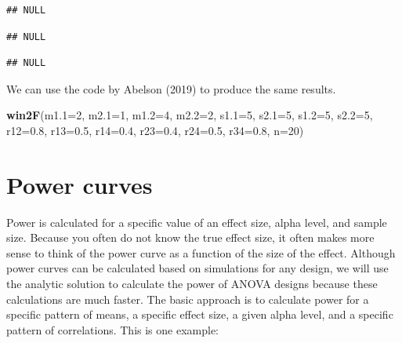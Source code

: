 \documentclass[]{book}
\newenvironment{Shaded}{\begin{snugshade}}{\end{snugshade}}
\newcommand{\DataTypeTok}[1]{\textcolor[rgb]{0.13,0.29,0.53}{#1}}
\newcommand{\DecValTok}[1]{\textcolor[rgb]{0.00,0.00,0.81}{#1}}
\newcommand{\FloatTok}[1]{\textcolor[rgb]{0.00,0.00,0.81}{#1}}
\newcommand{\KeywordTok}[1]{\textcolor[rgb]{0.13,0.29,0.53}{\textbf{#1}}}
\newcommand{\NormalTok}[1]{#1}
\newcommand{\OperatorTok}[1]{\textcolor[rgb]{0.81,0.36,0.00}{\textbf{#1}}}
\begin{document}
\begin{verbatim}
## NULL
\end{verbatim}

\begin{Shaded}
\end{Shaded}

\begin{verbatim}
## NULL
\end{verbatim}

\begin{Shaded}
\end{Shaded}

\begin{verbatim}
## NULL
\end{verbatim}

We can use the code by Abelson (2019) to produce the same results.

\begin{Shaded}
\begin{Highlighting}[]
\KeywordTok{win2F}\NormalTok{(}\DataTypeTok{m1.1=}\DecValTok{2}\NormalTok{, }\DataTypeTok{m2.1=}\DecValTok{1}\NormalTok{, }\DataTypeTok{m1.2=}\DecValTok{4}\NormalTok{, }\DataTypeTok{m2.2=}\DecValTok{2}\NormalTok{, }
      \DataTypeTok{s1.1=}\DecValTok{5}\NormalTok{, }\DataTypeTok{s2.1=}\DecValTok{5}\NormalTok{, }\DataTypeTok{s1.2=}\DecValTok{5}\NormalTok{, }\DataTypeTok{s2.2=}\DecValTok{5}\NormalTok{, }
      \DataTypeTok{r12=}\FloatTok{0.8}\NormalTok{, }\DataTypeTok{r13=}\FloatTok{0.5}\NormalTok{, }\DataTypeTok{r14=}\FloatTok{0.4}\NormalTok{, }
               \DataTypeTok{r23=}\FloatTok{0.4}\NormalTok{, }\DataTypeTok{r24=}\FloatTok{0.5}\NormalTok{, }
                        \DataTypeTok{r34=}\FloatTok{0.8}\NormalTok{,}
      \DataTypeTok{n=}\DecValTok{20}\NormalTok{)}
\end{Highlighting}
\end{Shaded}

\hypertarget{power-curves}{%
\chapter{Power curves}\label{power-curves}}

Power is calculated for a specific value of an effect size, alpha level, and sample size. Because you often do not know the true effect size, it often makes more sense to think of the power curve as a function of the size of the effect. Although power curves can be calculated based on simulations for any design, we will use the analytic solution to calculate the power of ANOVA designs because these calculations are much faster. The basic approach is to calculate power for a specific pattern of means, a specific effect size, a given alpha level, and a specific pattern of correlations. This is one example:
\end{document}
